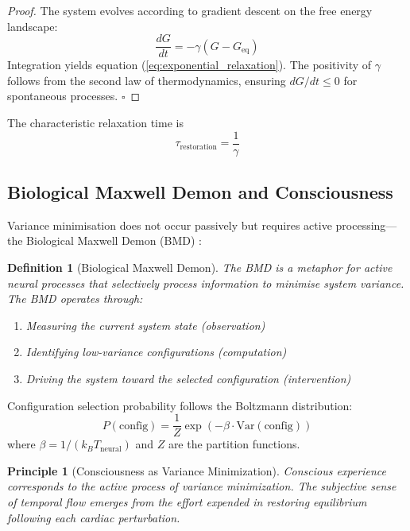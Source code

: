 \documentclass[12pt]{article}
\newtheorem{definition}[theorem]{Definition}
\newtheorem{principle}[theorem]{Principle}
\theoremstyle{remark}
\begin{document}
\begin{proof}
The system evolves according to gradient descent on the free energy landscape:
\begin{equation}
\frac{dG}{dt} = -\gamma(G - G_{\text{eq}})
\end{equation}
Integration yields equation (\ref{eq:exponential_relaxation}). The positivity of $\gamma$ follows from the second law of thermodynamics, ensuring $dG/dt \leq 0$ for spontaneous processes. $\square$
\end{proof}

The characteristic relaxation time is
\begin{equation}
\tau_{\text{restoration}} = \frac{1}{\gamma}
\label{eq:restoration_time}
\end{equation}

\subsection{Biological Maxwell Demon and Consciousness}

Variance minimisation does not occur passively but requires active processing—the Biological Maxwell Demon (BMD) \citep{bennett1987demons}:

\begin{definition}[Biological Maxwell Demon]
The BMD is a metaphor for active neural processes that selectively process information to minimise system variance. The BMD operates through:
\begin{enumerate}
\item Measuring the current system state (observation)
\item Identifying low-variance configurations (computation)
\item Driving the system toward the selected configuration (intervention)
\end{enumerate}
\end{definition}

Configuration selection probability follows the Boltzmann distribution:
\begin{equation}
P(\text{config}) = \frac{1}{Z} \exp\left(-\beta \cdot \text{Var}(\text{config})\right)
\label{eq:bmd_selection}
\end{equation}
where $\beta = 1/(k_B T_{\text{neural}})$ and $Z$ are the partition functions.

\begin{principle}[Consciousness as Variance Minimization]
Conscious experience corresponds to the active process of variance minimization. The subjective sense of temporal flow emerges from the effort expended in restoring equilibrium following each cardiac perturbation.
\end{principle}
\end{document}
